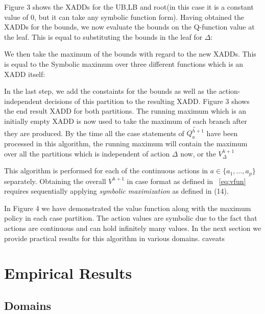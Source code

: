 \documentclass[letterpaper]{article}
\renewcommand{\-}{\text{-}}
\begin{document}
\begin{enumerate}
Figure 3 shows the XADDs for the UB,LB and root(in this case it is a constant value of 0, but it can take any symbolic function form). Having obtained the XADDs for the bounds, we now evaluate the bounds on the Q-function value at the leaf. This is equal to substituting the bounds in the leaf for $\Delta$: 

We then take the maximum of the bounds with regard to the new XADDs. This is equal to the Symbolic maximum over three different functions which is an XADD itself: 

In the last step, we add the constaints for the bounds as well as the action-independent decisions of this partition to the resulting XADD. Figure 3 shows the end result XADD for both partitions. The running maximum which is an initially empty XADD is now used to take the maximum of each branch after they are produced. By the time all the case statements of $ \tilde{Q_a^{h+1}}$ have been processed in this algorithm, the running maximum will contain the maximum over all the partitions which is independent of action $\Delta$ now, or the  $V_{\Delta}^{h+1}$

This algorithm is performed for each of the continuous actions in $a \in \{a_1,\ldots,a_p\}$ separately. Obtaining the overall $V^{h+1}$ in case format as defined in ~\eqref{eq:vfun} requires sequentially applying \emph{symbolic maximization} as defined in (14).
\end{enumerate}

In Figure 4 we have demonstrated the value function along with the maximum policy in each case partition. The action values are symbolic due to the fact that actions are continuous and can hold infinitely many values. In the next section we provide practical results for this algorithm in various domains. caveats



\section{Empirical Results}


\subsection{Domains}
\end{document}
